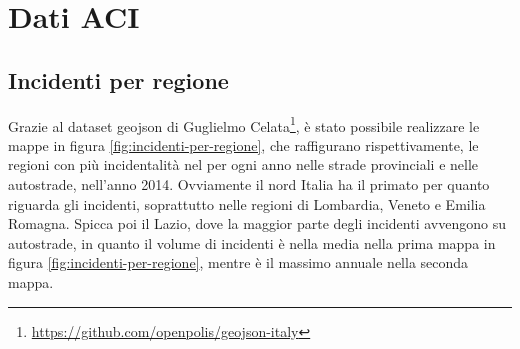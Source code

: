 \documentclass[a4paper]{report}
\begin{document}







\section{Dati ACI}


\subsection{Incidenti per regione}

Grazie al dataset geojson di Guglielmo Celata\footnote{\url{https://github.com/openpolis/geojson-italy}}, 
è stato possibile realizzare le mappe in figura \ref{fig:incidenti-per-regione}, 
che raffigurano rispettivamente, le regioni con 
più incidentalità nel per ogni anno nelle strade provinciali e nelle autostrade, nell'anno 2014.
Ovviamente il nord Italia ha il primato per quanto riguarda gli incidenti, soprattutto nelle regioni 
di Lombardia, Veneto e Emilia Romagna. 
Spicca poi il Lazio, dove la maggior parte degli incidenti avvengono su autostrade, in quanto il volume 
di incidenti è nella media nella prima mappa in figura \ref{fig:incidenti-per-regione}, mentre è il massimo annuale nella 
seconda mappa.
\end{document}
